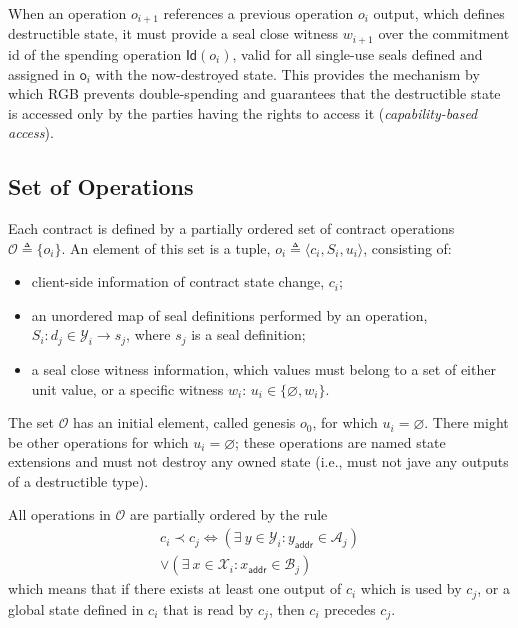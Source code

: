 \documentclass[9pt,oneside]{amsart}
\begin{document}
\begin{multicols}{2}
When an operation $o_{i+1}$ references a previous operation $o_i$ output,
which defines destructible state, it must provide a \gls{seal close witness} $w_{i+1}$
over the commitment id of the spending operation $\mathsf{Id}(o_i)$,
valid for all single-use seals defined and assigned in $\mathsf{o}_i$
with the now-destroyed state.
This provides the mechanism by which RGB prevents double-spending
and guarantees that the destructible state is accessed only by the parties
having the rights to access it (\emph{capability-based access}).

\subsection{Set of Operations}

Each contract is defined by a partially ordered set of contract operations
$\mathcal{O} \triangleq \{ o_i \}$.
An element of this set is a tuple, $o_i \triangleq \langle c_i, S_i, u_i \rangle$, consisting of:
\begin{itemize}
\item client-side information of contract state change, $c_i$;
\item an unordered map of seal definitions performed by an operation, 
  $S_i: d_j \in \mathcal{Y}_i \rightarrow s_j$, where $s_j$ is a seal definition;
\item a \gls{seal close witness} information, 
  which values must belong to a set of either unit value, or a specific witness $w_i$: 
  $u_i \in \{ \varnothing, w_i \}$.
\end{itemize}

The set $\mathcal{O}$ has an initial element, called \gls{genesis} $o_0$, for which $u_i = \varnothing$.
There might be other operations for which $u_i = \varnothing$;
these operations are named \glspl{state extension} and must not destroy any owned state
(i.e., must not jave any outputs of a destructible type).

All operations in $\mathcal{O}$ are partially ordered by the rule
\noindent
\begin{equation}
\begin{split}
c_i \prec c_j \Longleftrightarrow (\exists \ y \in \mathcal{Y}_i: y_\mathsf{addr} \in \mathcal{A}_j) \\
\vee (\exists \ x \in \mathcal{X}_i: x_\mathsf{addr} \in \mathcal{B}_j)
\end{split}
\end{equation}
\noindent
which means that if there exists at least one output of $c_i$ which is used by $c_j$, or a global
state defined in $c_i$ that is read by $c_j$, then $c_i$ precedes $c_j$.


\end{multicols}
\end{document}
